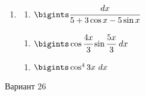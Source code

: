\documentclass{article}
\begin{document}
\begin{multicols}{2}
\begin{enumerate}[label=\Roman*.]
		\item
		\begin{multicols}{3}
			\begin{enumerate}[label=\arabic*.]
				\setlength\itemsep{1em}
				\item $\bigints\cfrac{dx}{5+3\cos x - 5\sin x}$
			\end{enumerate}
			\vfill\null\columnbreak
			\begin{enumerate}[label=\arabic*., start=2]
				\setlength\itemsep{1em}
				\item $\bigints\cos \cfrac{4x}{3}\sin\cfrac{5x}{3}\ dx$
			\end{enumerate}
			\vfill\null\columnbreak
			\begin{enumerate}[label=\arabic*., start=3]
				\setlength\itemsep{1em}
				\item $\bigints\cos^4 3x\ dx$
			\end{enumerate}
			\vfill\null\columnbreak
		\end{multicols}
	\end{enumerate}
	
	\vfill\null\columnbreak
	
	\centerline{Вариант 26}
	

\end{multicols}
\end{document}
